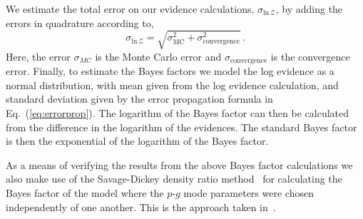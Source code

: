 We estimate the total error on our evidence calculations, $\sigma_{\mathrm{ln} \, \mathcal{Z}}$, by adding the errors in quadrature according to,
\begin{equation}
\sigma_{\mathrm{ln} \, \mathcal{Z}} = \sqrt{ \sigma_{\mathrm{MC}}^2 + \sigma_{\mathrm{convergence}}^2 } \, .
\label{eq:errorprop}
\end{equation}
Here, the error $\sigma_{MC}$ is the Monte Carlo error and $\sigma_{\mathrm{convergence}}$ is the convergence error. Finally, to estimate the Bayes factors we model the log evidence as a normal distribution, with mean given from the log evidence calculation, and standard deviation given by the error propagation formula in Eq.~(\ref{eq:errorprop}). The logarithm of the Bayes factor can then be calculated from the difference in the logarithm of the evidences. The standard Bayes factor is then the exponential of the logarithm of the Bayes factor.

As a means of verifying the results from the above Bayes factor calculations we also make use of the Savage-Dickey density ratio method~\citep{edwards1963bayesian, dickey1971weighted, wagenmakers2010bayesian} for calculating the Bayes factor of the model where the $p$-$g$ mode parameters were chosen independently of one another. This is the approach taken in~\cite{abbott2019constraining}.

